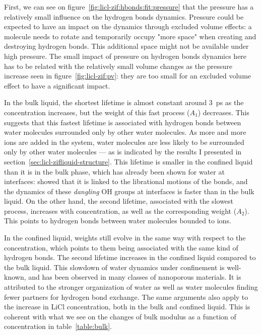 \documentclass[thesis]{subfiles}
\begin{document}
%     

First, we can see on figure~\ref{fig:licl-zif:hbonds:fit:pressure} that the
pressure has a relatively small influence on the hydrogen bonds dynamics.
Pressure could be expected to have an impact on the dynamics through excluded
volume effects\cite{Fogarty2014}: a molecule needs to rotate and temporarily
occupy "more space"  when creating and destroying hydrogen bonds. This
additional space might not be available under high pressure. The small impact of
pressure on hydrogen bonds dynamics here has to be related with the relatively
small volume changes as the pressure increase seen in
figure~\ref{fig:licl-zif:pv}: they are too small for an excluded volume effect
to have a significant impact.

In the bulk liquid, the shortest lifetime is almost constant around \SI{3}{ps}
as the concentration increases, but the weight of this fast process ($A_1$)
decreases. This suggests that this fastest lifetime is associated with hydrogen
bonds between water molecules surrounded only by other water molecules. As more
and more ions are added in the system, water molecules are less likely to be
surrounded only by other water molecules --- as is indicated by the results I
presented in section~\ref{sec:licl-zifliquid-structure}. This lifetime is
smaller in the confined liquid than it is in the bulk phase, which has already
been shown for water at interfaces: \citeauthor{Fogarty2014}\cite{Fogarty2014}
showed that it is linked to the librational motions of the  bonds, and
the dynamics of these \emph{dangling} OH groups at interfaces is faster than in
the bulk liquid\cite{Scatena2001}. On the other hand, the second lifetime,
associated with the slowest process, increases with concentration, as well as the
corresponding weight ($A_2$). This points to hydrogen bonds between water
molecules bounded to ions.

In the confined liquid, weights still evolve in the same way with respect to the
concentration, which points to them being associated with the same kind of
hydrogen bonds. The second lifetime increases in the confined liquid compared to
the bulk liquid. This slowdown of water dynamics under confinement is
well-known\cite{Fogarty2014}, and has been observed in many classes of
nanoporous materials\cite{Jeffery2004, RomeroVargasCastrillon2009, Haigis2013,
Scalfi2018}. It is attributed to the stronger organization of water as well as
water molecules finding fewer partners for hydrogen bond exchange. The same
arguments also apply to the increase in LiCl concentration, both in the bulk and
confined liquid. This is coherent with what we see on the changes of bulk
modulus as a function of concentration in table~\ref{table:bulk}.
\end{document}

